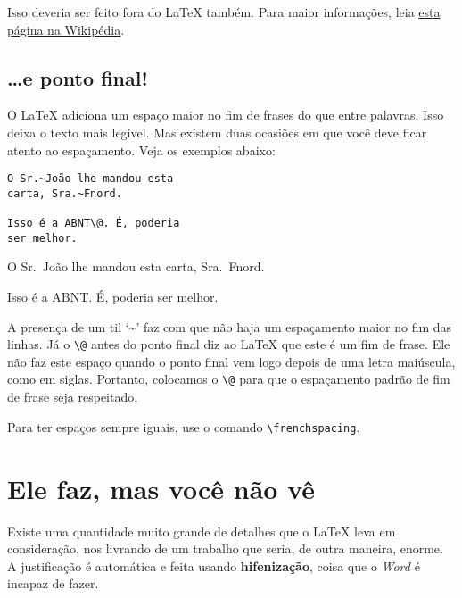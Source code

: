 Isso deveria ser feito fora do \LaTeX{} também. Para maior informações, leia \href{http://pt.wikipedia.org/wiki/Travess\%C3\%A3o#Como_fazer}{esta página na Wikipédia}.

\subsection{\ldots e ponto final!}

O \LaTeX{} adiciona um espaço maior no fim de frases do que entre palavras. Isso deixa o texto mais legível. Mas existem duas ocasiões em que você deve ficar atento ao espaçamento. Veja os exemplos abaixo:

\vspace{1em}

\begin{center}
\begin{minipage}[t]{6cm}
\begin{verbatim}
O Sr.~João lhe mandou esta 
carta, Sra.~Fnord.

Isso é a ABNT\@. É, poderia 
ser melhor.
\end{verbatim}
\end{minipage}
\begin{minipage}[t]{6cm}
O Sr.~João lhe mandou esta carta, Sra.~Fnord.

Isso é a ABNT\@. É, poderia ser melhor.
\end{minipage}
\end{center}

\vspace{1em}

A presença de um til `\~{}' faz com que não haja um espaçamento maior no fim das linhas. Já o \verb+\@+ antes do ponto final diz ao \LaTeX{} que este é um fim de frase. Ele não faz este espaço quando o ponto final vem logo depois de uma letra maiúscula, como em siglas. Portanto, colocamos o \verb+\@+ para que o espaçamento padrão de fim de frase seja respeitado.

Para ter espaços sempre iguais, use o comando \verb+\frenchspacing+. 

\section{Ele faz, mas você não vê}

Existe uma quantidade muito grande de detalhes que o \LaTeX{} leva em consideração, nos livrando de um trabalho que seria, de outra maneira, enorme. A justificação é automática e feita usando \textbf{hifenização}, coisa que o \emph{Word} é incapaz de fazer.

